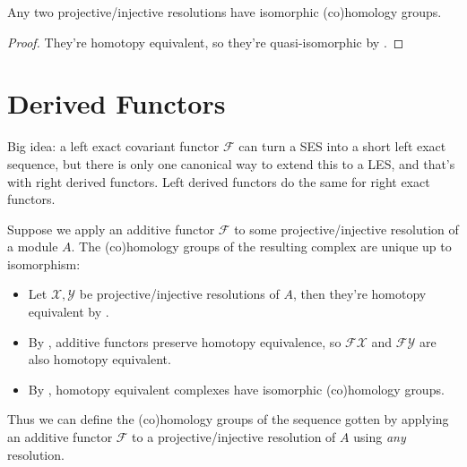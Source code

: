 \documentclass[twoside,10pt]{report}
\begin{document}
\begin{cor}
	Any two projective/injective resolutions have isomorphic (co)homology groups.
\end{cor}
\begin{proof}
	They're homotopy equivalent, so they're quasi-isomorphic by .
\end{proof}


\section{Derived Functors}

\begin{note}[]
Big idea: a left exact covariant functor $\mathcal{F}$ can turn a SES into a short left exact sequence, but there is only one canonical way to extend this to a LES, and that's with right derived functors. Left derived functors do the same for right exact functors.
\end{note}

Suppose we apply an additive functor $\mathcal{F}$ to some projective/injective resolution of a module $A$. The (co)homology groups of the resulting complex are unique up to isomorphism:
\begin{itemize}
	\item Let $\mathcal{X},\mathcal{Y}$ be projective/injective resolutions of $A$, then they're homotopy equivalent by .
	\item By , additive functors preserve homotopy equivalence, so $\mathcal{F}\mathcal{X}$ and $\mathcal{F}\mathcal{Y}$ are also homotopy equivalent.
	\item By , homotopy equivalent complexes have isomorphic (co)homology groups.
\end{itemize}

Thus we can define the (co)homology groups of the sequence gotten by applying an additive functor $\mathcal{F}$ to a projective/injective resolution of $A$ using \textit{any} resolution.
\end{document}
